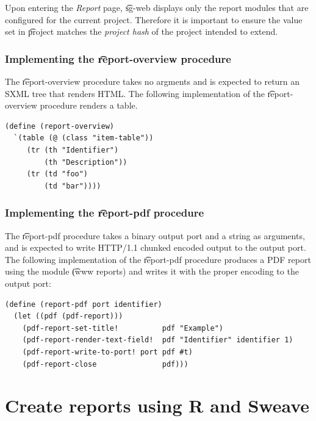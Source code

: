   Upon entering the \emph{Report} page, \t{sg-web} displays only the report
  modules that are configured for the current project.  Therefore it is
  important to ensure the value set in \t{project} matches the
  \emph{project hash} of the project intended to extend.

\subsubsection{Implementing the \t{report-overview} procedure}

  The \t{report-overview} procedure takes no argments and is expected to
  return an SXML tree that renders HTML.  The following implementation of
  the \t{report-overview} procedure renders a table.

\begin{siderules}
\begin{verbatim}
(define (report-overview)
  `(table (@ (class "item-table"))
     (tr (th "Identifier")
         (th "Description"))
     (tr (td "foo")
         (td "bar"))))
\end{verbatim}
\end{siderules}

\subsubsection{Implementing the \t{report-pdf} procedure}

  The \t{report-pdf} procedure takes a binary output port and a string as
  arguments, and is expected to write HTTP/1.1 chunked encoded output to
  the output port.  The following implementation of the \t{report-pdf}
  procedure produces a PDF report using the module \t{(www reports)}
  and writes it with the proper encoding to the output port:

\begin{siderules}
\begin{verbatim}
(define (report-pdf port identifier)
  (let ((pdf (pdf-report)))
    (pdf-report-set-title!          pdf "Example")
    (pdf-report-render-text-field!  pdf "Identifier" identifier 1)
    (pdf-report-write-to-port! port pdf #t)
    (pdf-report-close               pdf)))
\end{verbatim}
\end{siderules}

\pagebreak{}
\section{Create reports using R and Sweave}
\label{sec:sweave-reports}

